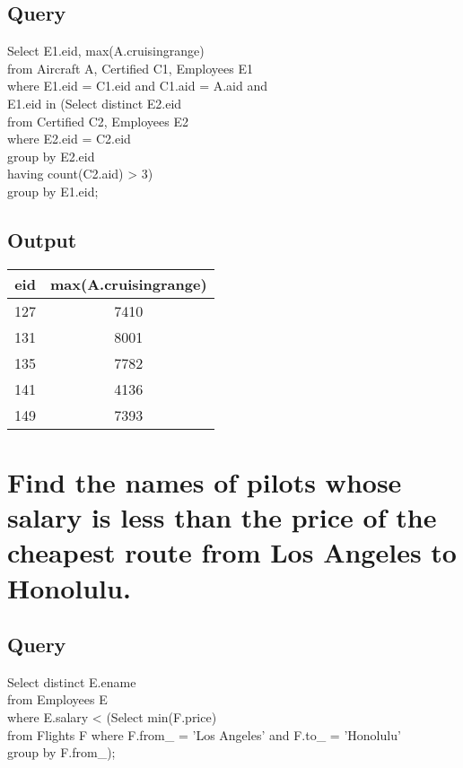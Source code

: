 \documentclass[11pt]{scrartcl} %
\begin{document}
\subsection{Query}
Select E1.eid, max(A.cruisingrange) \\
from Aircraft A, Certified C1, Employees E1\\ 
where E1.eid = C1.eid and C1.aid = A.aid and \\
\hspace*{10mm}E1.eid in (Select distinct E2.eid \\
\hspace*{10mm}from Certified C2, Employees E2\\ 
\hspace*{10mm}where E2.eid = C2.eid\\ 
\hspace*{10mm}group by E2.eid\\ 
\hspace*{10mm}having count(C2.aid) > 3) \\
\hspace*{10mm}group by E1.eid;

\subsection{Output}
\begin{left}
\begin{tabular}{ |c| c| }
\hline
\textbf{eid} & \textbf{max(A.cruisingrange)} \\
\hline
127 &	7410 \\
131 &	8001 \\
135	& 7782 \\
141	& 4136 \\
149	& 7393 \\
\hline

\end{tabular}
\end{left}





\section{Find the names of pilots whose salary is less than the price of the cheapest route from Los Angeles to Honolulu. }
\subsection{Query}
Select distinct E.ename \\
from Employees E \\
where E.salary < (Select min(F.price) \\
\hspace*{10mm}from Flights F where F.from\_ = 'Los Angeles' and F.to\_ = 'Honolulu'\\
\hspace*{10mm} group by F.from\_);
\end{document}
